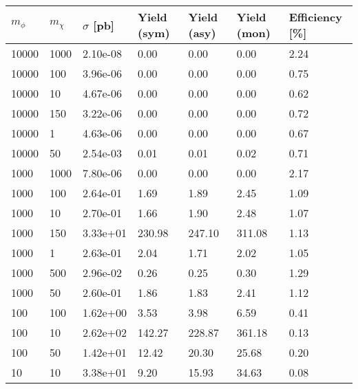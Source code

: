 \begin{table}
\small
\centering
\begin{tabular}{lllllll}
\hline
$m_\phi$ & $m_\chi$ & $\sigma$ [pb] & Yield (sym) & Yield (asy) & Yield (mon) & Efficiency [\%] \\ \hline
10000     &   1000      &   2.10e-08  &   0.00      &   0.00      &   0.00      &   2.24      \\ 
10000     &   100       &   3.96e-06  &   0.00      &   0.00      &   0.00      &   0.75      \\ 
10000     &   10        &   4.67e-06  &   0.00      &   0.00      &   0.00      &   0.62      \\ 
10000     &   150       &   3.22e-06  &   0.00      &   0.00      &   0.00      &   0.72      \\ 
10000     &   1         &   4.63e-06  &   0.00      &   0.00      &   0.00      &   0.67      \\ 
10000     &   50        &   2.54e-03  &   0.01      &   0.01      &   0.02      &   0.71      \\ 
1000      &   1000      &   7.80e-06  &   0.00      &   0.00      &   0.00      &   2.17      \\ 
1000      &   100       &   2.64e-01  &   1.69      &   1.89      &   2.45      &   1.09      \\ 
1000      &   10        &   2.70e-01  &   1.66      &   1.90      &   2.48      &   1.07      \\ 
1000      &   150       &   3.33e+01  &   230.98    &   247.10    &   311.08    &   1.13      \\ 
1000      &   1         &   2.63e-01  &   2.04      &   1.71      &   2.02      &   1.05      \\ 
1000      &   500       &   2.96e-02  &   0.26      &   0.25      &   0.30      &   1.29      \\ 
1000      &   50        &   2.60e-01  &   1.86      &   1.83      &   2.41      &   1.12      \\ 
100       &   100       &   1.62e+00  &   3.53      &   3.98      &   6.59      &   0.41      \\ 
100       &   10        &   2.62e+02  &   142.27    &   228.87    &   361.18    &   0.13      \\ 
100       &   50        &   1.42e+01  &   12.42     &   20.30     &   25.68     &   0.20      \\ 
10        &   10        &   3.38e+01  &   9.20      &   15.93     &   34.63     &   0.08      \\ 

\end{tabular}
\end{table}
